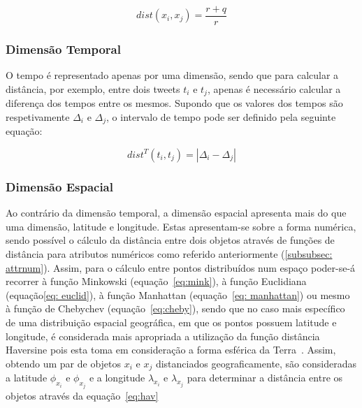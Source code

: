 \begin{equation}
 dist(x_{i}, x_{j}) =  \frac{r + q}{r}
\end{equation}

\subsubsection{Dimensão Temporal} \label{subsubsec: time}

O tempo é representado apenas por uma dimensão, sendo que para calcular a distância, por exemplo, entre dois tweets $ t_{i} $ e $ t_{j} $, apenas é necessário calcular a diferença dos tempos entre os mesmos. Supondo que os valores dos tempos são respetivamente $ \Delta_{i} $ e $ \Delta_{j} $, o intervalo de tempo pode ser definido pela seguinte equação:

\begin{equation}
dist^{T}( t_{i}, t_{j}) = |\Delta_{i} - \Delta_{j}|  
\end{equation}


\subsubsection{Dimensão Espacial} \label{subsubsec: space}

Ao contrário da dimensão temporal, a dimensão espacial apresenta mais do que uma dimensão, latitude e longitude. Estas apresentam-se sobre a forma numérica, sendo possível o cálculo da distância entre dois objetos através de funções de distância para atributos numéricos como referido anteriormente (\ref{subsubsec: attrnum}). Assim, para o cálculo entre pontos distribuídos num espaço poder-se-á recorrer à função Minkowski (equação~\ref{eq:mink}), à função Euclidiana (equação\ref{eq: euclid}), à função Manhattan (equação~\ref{eq: manhattan}) ou mesmo à função de Chebychev (equação~\ref{eq:cheby}), sendo que no caso mais específico de uma distribuição espacial geográfica, em que os pontos possuem latitude e longitude, é considerada mais apropriada a utilização da função distância Haversine pois esta toma em consideração a forma esférica da Terra~\cite{Montavont2006}. Assim, obtendo um par de objetos $ x_{i} $ e $ x_{j} $ distanciados geograficamente, são consideradas a latitude $ \phi_{x_{i}} $ e $ \phi_{x_{j}} $ e a longitude $ \lambda_{x_{i}} $ e $ \lambda_{x_{j}} $ para determinar a distância entre os objetos através da equação~\ref{eq:hav}


